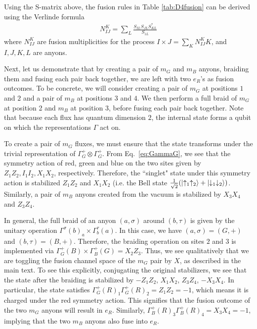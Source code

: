 \documentclass[nofootinbib,pra,twocolumn,showpacs,superscriptaddress,notitlepage,amsmath]{revtex4-2} %
\begin{document}
Using the S-matrix above, the fusion rules in Table \ref{tab:D4fusion} can be derived using the Verlinde formula~\cite{verlinde_fusion_1988}
\begin{align}
   N^{K}_{IJ} = \sum_{L}\frac{S_{IL}S_{JL}S_{KL}^*}{S_{1L}}
\end{align}
where $N^{K}_{IJ}$ are fusion multiplicities for the process $I \times J = \sum_K N^{K}_{IJ} K$, and $I,J,K,L$ are anyons.

Next, let us demonstrate that by creating a pair of $m_G$ and $m_B$ anyons, braiding them and fusing each pair back together, we are left with two $e_R$'s as fusion outcomes. To be concrete, we will consider creating a pair of $m_G$ at positions $1$ and $2$ and a pair of $m_B$ at positions $3$ and $4$. We then perform a full braid of $m_G$ at position 2 and $m_B$ at position 3, before fusing each pair back together. Note that because each flux has quantum dimension $2$, the internal state forms a qubit on which the representations $\Gamma$ act on.


To create a pair of $m_G$ fluxes, we must ensure that the state transforms under the trivial representation of $\Gamma^+_G \otimes \Gamma^+_G$. From Eq.~\ref{eq:GammaG}, we see that the symmetry action of red, green and blue on the two sites given by $Z_1Z_2, I_1I_2, X_1X_2$, respectively. Therefore, the ``singlet" state under this symmetry action is stabilized $Z_1Z_2$ and $X_1X_2$ (i.e. the Bell state $\frac{1}{\sqrt{2}}(\ket{\uparrow_1 \uparrow_2}+ \ket{\downarrow_1 \downarrow_2})$. Similarly, a pair of $m_B$ anyons created from the vacuum is stabilized by $X_3X_4$ and $Z_3Z_4$.

In general, the full braid of an anyon $(a,\sigma)$ around $(b,\tau)$ is given by the unitary operation $\Gamma^\sigma(b)_a \times \Gamma^\tau_b(a)$. In this case, we have $(a,\sigma) = (G,+)$ and $(b,\tau) = (B,+)$. Therefore, the braiding operation on sites $2$ and $3$ is implemented via $\Gamma^+_G(B) \times \Gamma^+_B(G) = X_2Z_3$. Thus, we see qualitatively that we are toggling the fusion channel space of the $m_G$ pair by $X$, as described in the main text. To see this explicitly, conjugating the original stabilizers, we see that the state after the braiding is stabilized by $-Z_1Z_2$, $X_1X_2$, $Z_3Z_4$, $-X_3X_4$. In particular, the state satisfies $\Gamma^+_G(R)_1 \Gamma^+_G(R)_2 = Z_1Z_2 = -1$, which means it is charged under the red symmetry action. This signifies that the fusion outcome of the two $m_G$ anyons will result in $e_R$. Similarly, $\Gamma^+_B(R)_3 \Gamma^+_B(R)_4 = X_3X_4 = -1$, implying that the two $m_B$ anyons also fuse into $e_R$.
\end{document}
